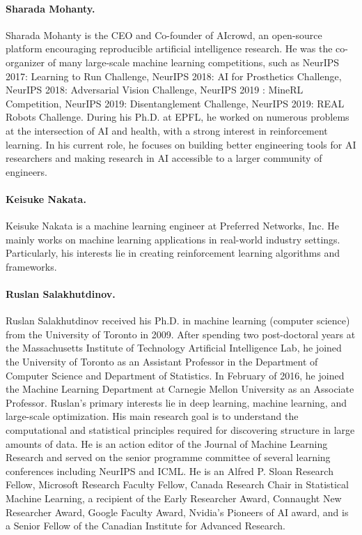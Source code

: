 \paragraph{Sharada Mohanty.} Sharada Mohanty is the CEO and Co-founder of AIcrowd, an open-source platform encouraging reproducible artificial intelligence research. 
He was the co-organizer of many large-scale machine learning competitions, such as NeurIPS 2017: Learning to Run Challenge, NeurIPS 2018: AI for Prosthetics Challenge, NeurIPS 2018: Adversarial Vision Challenge, NeurIPS 2019 : MineRL Competition, NeurIPS 2019: Disentanglement Challenge, NeurIPS 2019: REAL Robots Challenge. 
During his Ph.D. at EPFL, he worked on numerous problems at the intersection of AI and health, with a strong interest in reinforcement learning.  
In his current role, he focuses on building better engineering tools for AI researchers and making research in AI accessible to a larger community of engineers. 

\paragraph{Keisuke Nakata.} Keisuke Nakata is a machine learning engineer at Preferred Networks, Inc. He mainly works on machine learning applications in real-world industry settings. Particularly, his interests lie in creating reinforcement learning algorithms and frameworks.

\paragraph{Ruslan Salakhutdinov.} Ruslan Salakhutdinov received his Ph.D. in machine learning (computer science) from the University of Toronto in 2009. After spending two post-doctoral years at the Massachusetts Institute of Technology Artificial Intelligence Lab, he joined the University of Toronto as an Assistant Professor in the Department of Computer Science and Department of Statistics. In February of 2016, he joined the Machine Learning Department at Carnegie Mellon University as an Associate Professor. Ruslan's primary interests lie in deep learning, machine learning, and large-scale optimization. His main research goal is to understand the computational and statistical principles required for discovering structure in large amounts of data. He is an action editor of the Journal of Machine Learning Research and served on the senior programme committee of several learning conferences including NeurIPS and ICML. He is an Alfred P. Sloan Research Fellow, Microsoft Research Faculty Fellow, Canada Research Chair in Statistical Machine Learning, a recipient of the Early Researcher Award, Connaught New Researcher Award, Google Faculty Award, Nvidia's Pioneers of AI award, and is a Senior Fellow of the Canadian Institute for Advanced Research.

